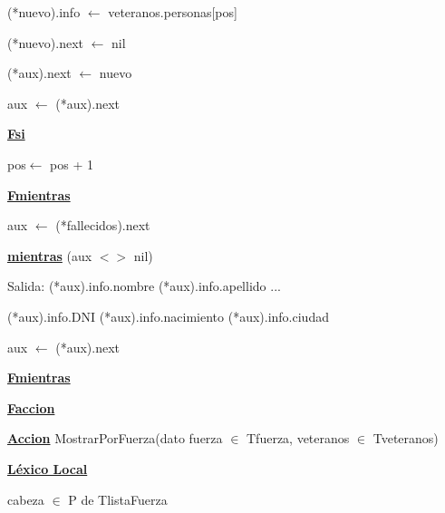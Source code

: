 \documentclass{article}
\begin{document}
                    \hspace{20mm}(*nuevo).info $\leftarrow$ veteranos.personas[pos]

                    \hspace{20mm}(*nuevo).next $\leftarrow$ nil

                    \hspace{20mm}(*aux).next $\leftarrow$ nuevo

                    \hspace{20mm}aux $\leftarrow$ (*aux).next

                \hspace{16mm}\underline{\textbf{Fsi}}

                \hspace{16mm}pos$\leftarrow$ pos + 1

            \hspace{12mm}\underline{\textbf{Fmientras}}

            \hspace{12mm}aux $\leftarrow$ (*fallecidos).next

            \hspace{12mm}\underline{\textbf{mientras}} (aux $<>$ nil)

                \hspace{16mm}Salida: (*aux).info.nombre (*aux).info.apellido ...

                    \hspace{24mm}(*aux).info.DNI (*aux).info.nacimiento (*aux).info.ciudad

                \hspace{16mm}aux $\leftarrow$ (*aux).next

            \hspace{12mm}\underline{\textbf{Fmientras}}

    \hspace{4mm}\underline{\textbf{Faccion}}

    \vspace{4mm}

    \hspace{4mm}\underline{\textbf{Accion}} MostrarPorFuerza(dato fuerza $\in$ Tfuerza, veteranos $\in$ Tveteranos)

        \hspace{8mm}\underline{\textbf{Léxico Local}}

            \hspace{12mm}cabeza $\in$ P de TlistaFuerza
\end{document}
